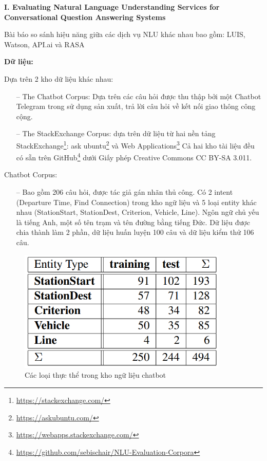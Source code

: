 \textbf{I. Evaluating Natural Language Understanding Services for Conversational Question Answering Systems}

Bài báo so sánh hiệu năng giữa các dịch vụ NLU khác nhau bao gồm: LUIS, Watson, API.ai và RASA

\textbf{Dữ liệu:}

Dựa trên 2 kho dữ liệu khác nhau:
\begin{itemize}
    \item[--] The Chatbot Corpus: Dựa trên các câu hỏi được thu thập bởi một Chatbot Telegram trong sử dụng sản xuất, trả lời câu hỏi về kết nối giao thông công cộng.
    \item[--] The StackExchange Corpus: dựa trên dữ liệu từ hai nền tảng StackExchange\footnote{\url{https://stackexchange.com/}}: ask ubuntu\footnote{\url{https://askubuntu.com/}} và Web Applications\footnote{\url{https://webapps.stackexchange.com/}} Cả hai kho tài liệu đều có sẵn trên GitHub\footnote{\url{https://github.com/sebischair/NLU-Evaluation-Corpora}}  dưới Giấy phép Creative Commons CC BY-SA 3.011.
\end{itemize}

Chatbot Corpus:

\begin{itemize}
    \item[--] Bao gồm 206 câu hỏi, được tác giả gán nhãn thủ công. Có 2 intent (Departure Time, Find Connection) trong kho ngữ liệu và 5 loại entity khác nhau (StationStart, StationDest, Criterion, Vehicle, Line). Ngôn ngữ chủ yếu là tiếng Anh, một số tên trạm và tên đường bằng tiếng Đức. Dữ liệu được chia thành làm 2 phần, dữ liệu huấn luyện 100 câu và dữ liệu kiểm thử 106 câu.
\end{itemize}

\begin{figure}[htp]
    \centering
    \includegraphics[width=10cm]{images/comparisonimg/1.png}
    \caption{Các loại thực thể trong kho ngữ liệu chatbot}
    \label{fig:comparisonimg-1}
\end{figure}

